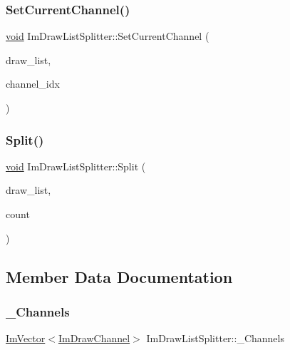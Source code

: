 \subsubsection{\texorpdfstring{Set\+Current\+Channel()}{SetCurrentChannel()}}
{\footnotesize\ttfamily \hyperlink{imgui__impl__opengl3__loader_8h_ac668e7cffd9e2e9cfee428b9b2f34fa7}{void} Im\+Draw\+List\+Splitter\+::\+Set\+Current\+Channel (\begin{DoxyParamCaption}\item[{\hyperlink{structImDrawList}{Im\+Draw\+List} $\ast$}]{draw\+\_\+list,  }\item[{int}]{channel\+\_\+idx }\end{DoxyParamCaption})}

\mbox{\label{structImDrawListSplitter_aa491c5b1e10b2f5340e7db4949d31255}} 
\subsubsection{\texorpdfstring{Split()}{Split()}}
{\footnotesize\ttfamily \hyperlink{imgui__impl__opengl3__loader_8h_ac668e7cffd9e2e9cfee428b9b2f34fa7}{void} Im\+Draw\+List\+Splitter\+::\+Split (\begin{DoxyParamCaption}\item[{\hyperlink{structImDrawList}{Im\+Draw\+List} $\ast$}]{draw\+\_\+list,  }\item[{int}]{count }\end{DoxyParamCaption})}



\subsection{Member Data Documentation}
\mbox{\label{structImDrawListSplitter_ab3b0bdddacaa7b347c41735c2d9952dc}} 
\subsubsection{\texorpdfstring{\+\_\+\+Channels}{\_Channels}}
{\footnotesize\ttfamily \hyperlink{structImVector}{Im\+Vector}$<$\hyperlink{structImDrawChannel}{Im\+Draw\+Channel}$>$ Im\+Draw\+List\+Splitter\+::\+\_\+\+Channels}

